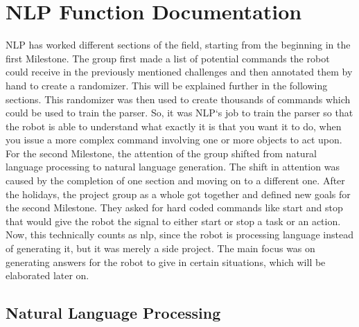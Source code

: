 \documentclass[main.tex]{subfiles}
\begin{document}
	\begingroup

	\renewcommand{\cleardoublepage}{}

	\renewcommand{\clearpage}{}

	\chapter{NLP Function Documentation}
		
	NLP has worked different sections of the field, starting from the beginning in the first Milestone. The group first made a list of potential commands the robot could receive in the previously mentioned challenges and then annotated them by hand to create a randomizer. This will be explained further in the following sections. This randomizer was then used to create thousands of commands which could be used to train the parser. So, it was NLP‘s job to train the parser so that the robot is able to understand what exactly it is that you want it to do, when you issue a more complex command involving one or more objects to act upon. 
For the second Milestone, the attention of the group shifted from natural language processing to natural language generation. The shift in attention was caused by the completion of one section and moving on to a different one. 
After the holidays, the project group as a whole got together and defined new goals for the second Milestone. They asked for hard coded commands like start and stop that would give the robot the signal to either start or stop a task or an action. Now, this technically counts as nlp, since the robot is processing language instead of generating it, but it was merely a side project. The main focus was on generating answers for the robot to give in certain situations, which will be elaborated later on.
		
	 \section{Natural Language Processing}
	\endgroup
\end{document}
